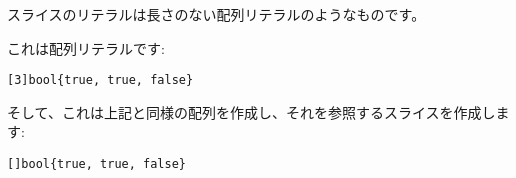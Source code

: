 スライスのリテラルは長さのない配列リテラルのようなものです。

これは配列リテラルです:

\begin{lstlisting}[numbers=none]
[3]bool{true, true, false}
\end{lstlisting}

そして、これは上記と同様の配列を作成し、それを参照するスライスを作成します:

\begin{lstlisting}[numbers=none]
[]bool{true, true, false}
\end{lstlisting}